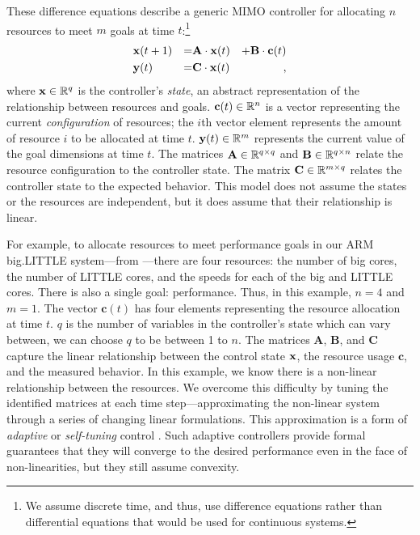 These difference equations describe a generic MIMO controller for
allocating $n$ resources to meet $m$ goals at time $t$:\footnote{We
  assume discrete time, and thus, use difference equations rather than
  differential equations that would be used for continuous systems.}
\begin{equation}
\begin{aligned}
&\mathbf{x}(t+1) &=& \mathbf{A} \cdot \mathbf{x}(t)& + \mathbf{B} \cdot \mathbf{c}(t)\\
&\mathbf{y}(t)   &=& \mathbf{C} \cdot \mathbf{x}(t)&,
\end{aligned}
\label{eqn:system:mimo}
\end{equation}
where $\mathbf{x} \in \mathbb{R}^{q}$ is the controller's \emph{state}, an abstract
representation of the relationship between resources and goals.
$\mathbf{c}(t) \in \mathbb{R}^n$ is a vector representing the current
\emph{configuration} of resources; \ie{} the $i$th vector element
represents the amount of resource $i$ to be allocated at time $t$.
$\mathbf{y}(t) \in \mathbb{R}^{m}$ represents the current value of the goal dimensions
at time $t$. The matrices $\mathbf{A} \in \mathbb{R}^{q \times q}$ and
$\mathbf{B} \in \mathbb{R}^{q \times n}$ relate the resource configuration to
the controller state.  The matrix $\mathbf{C} \in \mathbb{R}^{m \times q}$
relates the controller state to the expected behavior.  This model
does not assume the states or the resources are independent, but it
does assume that their relationship is linear.

For example, to allocate resources to meet performance goals in our
ARM big.LITTLE system---from ---there are four
resources: the number of big cores, the number of LITTLE cores, and
the speeds for each of the big and LITTLE cores.  There is also a
single goal: performance.  Thus, in this example, $n=4$ and $m=1$. The
vector $\mathbf{c}(t)$ has four elements representing the resource
allocation at time $t$. $q$ is the number of variables in the controller's 
state which can vary between, we can choose $q$ to be between 1 to $n$.
The matrices $\mathbf{A}$, $\mathbf{B}$, and
$\mathbf{C}$ capture the linear relationship between the control state
$\mathbf{x}$, the resource usage $\mathbf{c}$, and the measured behavior.  In
this example, we know there is a non-linear relationship between the
resources.  We overcome this difficulty by tuning the identified
matrices at each time step---approximating the non-linear system
through a series of changing linear formulations.  This approximation
is a form of \emph{adaptive} or \emph{self-tuning} control
\cite{AdaptiveControl}.  Such adaptive controllers provide formal
guarantees that they will converge to the desired performance even in
the face of non-linearities, but they still assume convexity.

